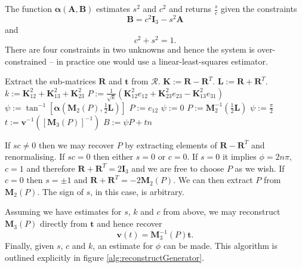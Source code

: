 \begin{definition}
The function $\mathbf{\alpha}(\mathbf{A},\mathbf{B})$ estimates $s^2$ 
and $c^2$ and returns $\frac{s}{c}$ given the constraints
\[
\mathbf{B} = c^2 \mathbf{I}_3 - s^2\mathbf{A}
\]
and
\[
c^2 + s^2 = 1.
\]
There are four constraints in two unknowns and hence the system is over-constrained -- in practice one would use a linear-least-squares estimator.
\end{definition}

\begin{fancyalg}
\begin{algorithmic}[1]
\STATE Extract the sub-matrices $\mathbf{R}$ and $\mathbf{t}$ from $\mathcal{R}$.
\STATE $\mathbf{K} := \mathbf{R} - \mathbf{R}^T$.
\STATE $\mathbf{L} := \mathbf{R} + \mathbf{R}^T$.
\STATE $k := \mathbf{K}^2_{12} + \mathbf{K}^2_{13} + \mathbf{K}^2_{23} $
\STATE $P := \frac{1}{\sqrt{k}}\left(\mathbf{K}^2_{12}e_{12} + \mathbf{K}^2_{23}e_{23} - \mathbf{K}^2_{13}e_{31}\right)$
\STATE $\psi := \tan^{-1}\left[\mathbf{\alpha}\left(\mathbf{M}_2(P), \frac{1}{2}\mathbf{L}\right)\right]$
\ELSE
{}
\STATE $P := e_{12}$
\STATE $\psi := 0$
\ELSE
\STATE $P := \mathbf{M}^{-1}_2\left(\frac{1}{2}\mathbf{L}\right)$
\STATE $\psi := \frac{\pi}{2}$
\ENDIF
\ENDIF
\STATE $t := \mathbf{v}^{-1}\left(\left[\mathbf{M}_3(P)\right]^{-1}\right)$
\STATE $B := \psi P + tn$
\end{algorithmic}
\caption{Reconstruction of a generator from a $4\times4$ transformation matrix.%
\label{alg:reconstructGenerator}}
\end{fancyalg}

If $sc \ne 0$ then we may recover $P$ by extracting elements of 
$\mathbf{R} - \mathbf{R}^{T}$ and renormalising. If $sc = 0$ then either
$s = 0$ or $c = 0$. If $s = 0$ it implies $\phi = 2n\pi$, $c = 1$ and 
therefore
$\mathbf{R} + \mathbf{R}^{T} = 2\mathbf{I}_3$ and
we are free to choose $P$ as we wish. If $c = 0$ then $s = \pm 1$
and $\mathbf{R} + \mathbf{R}^{T} = -2 \mathbf{M}_2(P)$. We can then
extract $P$ from $\mathbf{M}_2(P)$. The sign of $s$, in this case, is arbitrary.

Assuming we have estimates for $s$, $k$ and $c$ from above, we may
reconstruct $\mathbf{M}_3(P)$ directly from $\mathbf{t}$ and hence recover
\[
\mathbf{v}(t) = \mathbf{M}^{-1}_3(P) \mathbf{t}.
\]
Finally, given $s$, $c$ and $k$, an estimate for 
$\phi$ can be made. This algorithm is outlined explicitly in figure 
\ref{alg:reconstructGenerator}.

